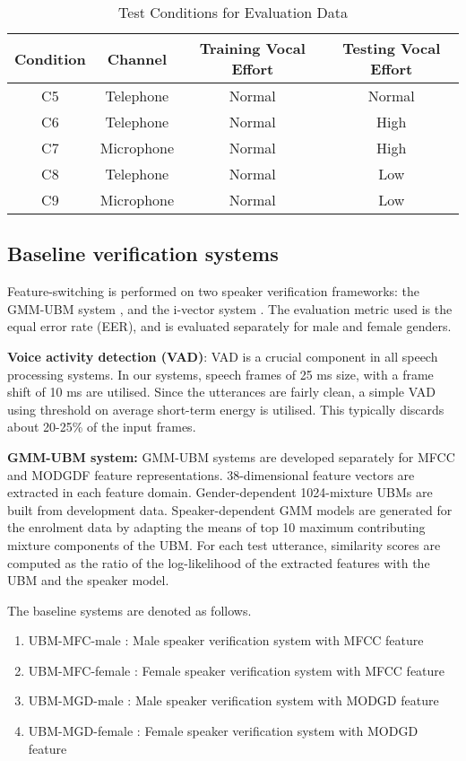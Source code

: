 \documentclass{article}
\begin{document}
\begin{table}[h!tb]
\centering
\caption{Test Conditions for Evaluation Data}
\begin{tabular}{|c|c|c|c|}
\hline
Condition & Channel & Training Vocal Effort & Testing Vocal Effort \\ 
\hline \hline
C5 & Telephone & Normal & Normal \\ \hline
C6 & Telephone & Normal & High \\ \hline
C7 & Microphone & Normal & High \\ \hline
C8 & Telephone & Normal & Low \\ \hline
C9 & Microphone & Normal & Low \\ \hline
\end{tabular}
\label{tab:datasetConditions}
\end{table}



\subsection{Baseline verification systems}
\label{subsec:baseline}

Feature-switching is performed on two speaker verification frameworks: the GMM-UBM system \cite{reynoldsAdaptedGMM}, and
the i-vector system \cite{dehak_ivector}. The evaluation metric
used is the equal error rate (EER), and is evaluated separately
for male and female genders.

\textbf{Voice activity detection (VAD)}: VAD is a crucial
 component in all speech processing systems. In our systems,
 speech frames of 25 ms size, with a frame shift of 10 ms are 
 utilised. Since the utterances are fairly clean, a simple VAD 
 using threshold on average short-term energy is utilised. This
 typically discards about 20-25\% of the input frames.

\textbf{GMM-UBM system:} GMM-UBM systems are developed separately for MFCC and MODGDF feature representations. 
38-dimensional feature vectors are extracted in each feature 
domain. Gender-dependent 1024-mixture UBMs are built 
from development data.  Speaker-dependent GMM models are generated for the enrolment data by adapting the means of top
10 maximum contributing mixture components of the UBM. For each
test utterance, similarity scores are computed as the ratio of
the log-likelihood of the extracted features with the UBM and
the speaker model.

The baseline systems are denoted as follows.
\begin{enumerate}
\item UBM-MFC-male : Male speaker verification system with MFCC feature
\item UBM-MFC-female : Female speaker verification system with MFCC feature
\item UBM-MGD-male : Male speaker verification system with MODGD feature
\item UBM-MGD-female : Female speaker verification system with MODGD feature
\end{enumerate}
\end{document}
